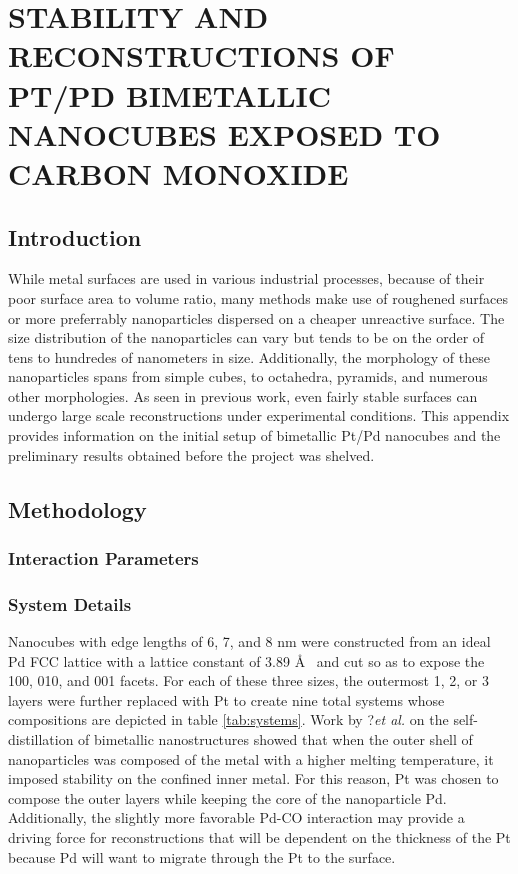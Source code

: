 
\chapter{STABILITY AND RECONSTRUCTIONS OF PT/PD BIMETALLIC NANOCUBES EXPOSED TO CARBON MONOXIDE}

\section{Introduction}

While metal surfaces are used in various industrial processes, because of their
poor surface area to volume ratio, many methods make use of roughened surfaces
or more preferrably nanoparticles dispersed on a cheaper unreactive surface. The size distribution of the
nanoparticles can vary but tends to be on the order of tens to hundredes of nanometers
in size. Additionally, the morphology of these nanoparticles spans from simple
cubes, to octahedra, pyramids, and numerous other morphologies.\citep{} As seen
in previous work\cite{Michalka, Tao}, even fairly stable surfaces can undergo
large scale reconstructions under experimental conditions. This appendix
provides information on the initial setup of bimetallic Pt/Pd nanocubes and the
preliminary results obtained before the project was shelved. 

\section{Methodology}

\subsection{Interaction Parameters}

\subsection{System Details}
Nanocubes with edge lengths of 6, 7, and 8 nm were constructed from an ideal Pd
FCC lattice with a lattice constant of 3.89 \AA~  and cut so as to expose the
{100}, {010}, and {001} facets. For each of these three sizes, the outermost 1,
2, or 3 layers were further replaced with Pt to create nine total systems whose compositions
are depicted in table \ref{tab:systems}. Work by ?{\it et al.}\citep{} on the
self-distillation of bimetallic nanostructures showed that when the outer shell
of nanoparticles was composed of the metal with a higher melting temperature,
it imposed stability on the confined inner metal. For this reason, Pt was
chosen to compose the outer layers while keeping the core of the nanoparticle
Pd. Additionally, the slightly more favorable Pd-CO interaction may provide a
driving force for reconstructions that will be dependent on the thickness of
the Pt because Pd will want to migrate through the Pt to the surface.

